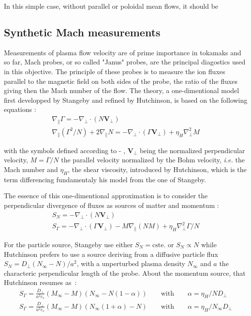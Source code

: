 \documentclass[cpp,a4paper,fleqn,twoside%
]{w-art}
\makeatletter
\renewcommand*{\eqref}[1]{%
  \hyperref[{#1}]{\textup{\tagform@{\ref*{#1}}}}%
}
\makeatother
\begin{document}
In this simple case, without parallel or poloidal mean flows, it should 
be 

\subsection{\bf Synthetic Mach measurements}
Measurements of plasma flow velocity are of prime importance in 
tokamaks and so far, Mach probes, or so called "Janus" probes, are the 
principal diagostics used in this objective. The principle of these 
probes is to measure the ion fluxes parallel to the magnetic field on 
both sides of the probe, the ratio of the 
fluxes giving then the Mach number of the flow. The theory, a 
one-dimentional model first developped 
by Stangeby\cite{Stangeby84} and refined by 
Hutchinson\cite{Hutchinson87,Hutchinson88,Hutchinson91}, is based on 
the following equations :
\begin{gather}
\nabla_\parallel\Gamma=-\nabla_\perp\cdot\left(N\mathbf 
V_\perp\right)
\\
\nabla_\parallel\left(\Gamma^2/N\right)+2\nabla_\parallel N= 
-\nabla_\perp\cdot\left(\Gamma\mathbf 
V_\perp\right)+\eta_H\nabla_\perp^2 M
\end{gather}

with the symbols defined according to 
\eqref{eq_particle_balance}-\eqref{eq_charge_balance}, $\mathbf V_\perp$ 
being the normalized perpendicular velocity, $M=\Gamma/N$ the parallel 
velocity normalized by the Bohm velocity, \emph{i.e.} the Mach number and 
$\eta_H$, the shear viscosity, introduced by Hutchinson, which is the term 
differencing fundamentaly his model from the one of Stangeby. 

The essence of this one-dimentional approximation is to consider the 
perpendicular divergence of fluxes as sources of matter and momentum :
\begin{gather}
S_N=-\nabla_\perp\cdot\left(N\mathbf V_\perp\right)
\\
S_\Gamma=-\nabla_\perp\cdot\left(\Gamma\mathbf 
V_\perp\right)-M\nabla_\parallel \left(NM\right)+\eta_H\nabla_\perp^2\Gamma/N
\end{gather}

For the particle source, Stangeby use either $S_N=\text{cste.}$ or 
$S_N\propto N$ while Hutchinson prefers to use a source deriving from a 
diffusive particle flux $S_N=D_\perp\left(N_\infty-N\right)/a^2$, with a 
unperturbed plasma density $N_\infty$ and $a$ the characteric perpendicular 
length of the probe. 
About the momentum source, that Hutchinson resumes as~\cite{Hutchinson02}:
\begin{gather}
S_\Gamma=\frac{D_\perp}{a^2c_s}\left(M_\infty-M\right)\left(N_\infty-N\left(1-
\alpha\right)\right)\qquad \text{with}\qquad\alpha=\eta_H/N D_\perp
\\
S_\Gamma=\frac{D_\perp}{a^2c_s}\left(M_\infty-M\right)\left(N_\infty\left(1+\alpha\right)-N
\right)\qquad \text{with}\qquad\alpha=\eta_H/ N_\infty D_\perp
\end{gather}
\end{document}
